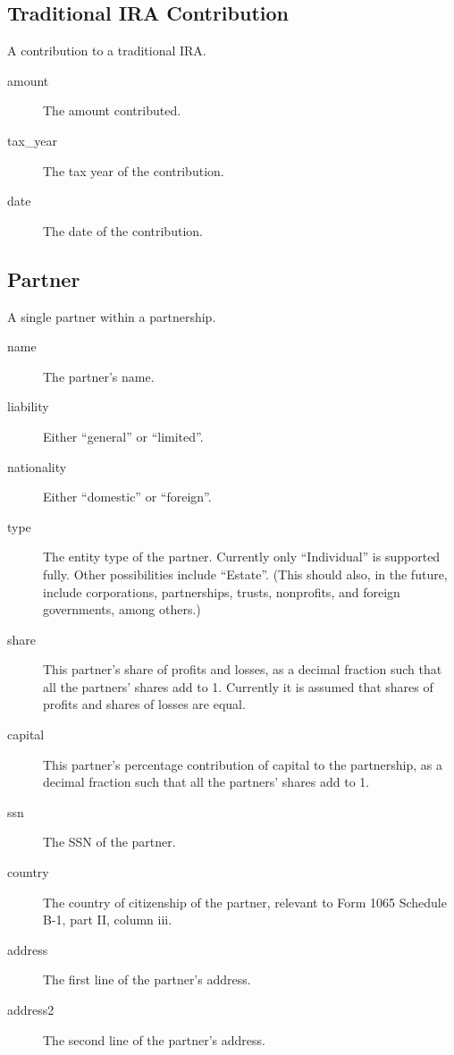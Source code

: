 \documentclass[12pt]{article}
\begin{document}
\subsection{Traditional IRA Contribution}

A contribution to a traditional IRA.

\begin{description}
\item[amount] The amount contributed.
\item[tax\_year] The tax year of the contribution.
\item[date] The date of the contribution.
\end{description}


\subsection{Partner}

A single partner within a partnership.

\begin{description}
\item[name] The partner's name.
\item[liability] Either ``general'' or ``limited''.
\item[nationality] Either ``domestic'' or ``foreign''.
\item[type] The entity type of the partner. Currently only ``Individual'' is
supported fully. Other possibilities include ``Estate''. (This should also, in
the future, include corporations, partnerships, trusts, nonprofits, and foreign
governments, among others.)
\item[share] This partner's share of profits and losses, as a decimal fraction
such that all the partners' shares add to 1. Currently it is assumed that shares
of profits and shares of losses are equal.
\item[capital] This partner's percentage contribution of capital to the
partnership, as a decimal fraction such that all the partners' shares add to 1.
\item[ssn] The SSN of the partner.
\item[country] The country of citizenship of the partner, relevant to Form 1065
Schedule B-1, part II, column iii.
\item[address] The first line of the partner's address.
\item[address2] The second line of the partner's address.
\end{description}
\end{document}
